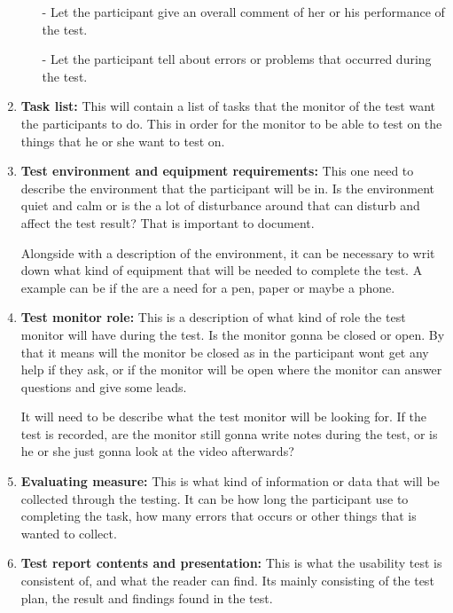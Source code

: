 \begin{enumerate}
\begin{enumerate}
  - Let the participant give an overall comment of her or his performance of the test.
  
  - Let the participant tell about errors or problems that occurred during the test.
  
  \end{enumerate}
  \item \textbf{Task list:} This will contain a list of tasks that the monitor of the test want the participants to do. This in order for the monitor to be able to test on the things that he or she want to test on.
  
  \item \textbf{Test environment and equipment requirements:} This one need to describe the environment that the participant will be in. Is the environment quiet and calm or is the a lot of disturbance around that can disturb and affect the test result? That is important to document.
  
  Alongside with a description of the environment, it can be necessary to writ down what kind of equipment that will be needed to complete the test. A example can be if the are a need for a pen, paper or maybe a phone. 
  
  \item \textbf{Test monitor role:} This is a description of what kind of role the test monitor will have during the test. Is the monitor gonna be closed or open. By that it means will the monitor be closed as in the participant wont get any help if they ask, or if the monitor will be open where the monitor can answer questions and give some leads.
  
  It will need to be describe what the test monitor will be looking for. If the test is recorded, are the monitor still gonna write notes during the test, or is he or she just gonna look at the video afterwards?  
  
  \item \textbf{Evaluating measure:} This is what kind of information or data that will be collected through the testing. It can be how long the participant use to completing the task, how many errors that occurs or other things that is wanted to collect.

  \item \textbf{Test report contents and presentation:} This is what the usability test is consistent of, and what the reader can find. Its mainly consisting of the test plan, the result and findings found in the test.
\end{enumerate}

